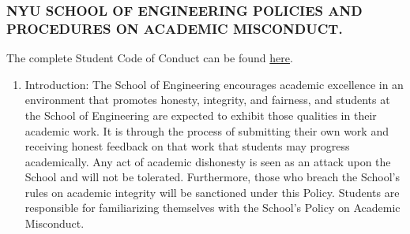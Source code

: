 \documentclass[10pt]{article}
\begin{document}
\subsubsection{NYU SCHOOL OF ENGINEERING POLICIES AND PROCEDURES ON ACADEMIC MISCONDUCT.}
The complete Student Code of Conduct can be found \href{https://engineering.nyu.edu/campus-and-community/student-life/office-student-affairs/policies/student-code-conduct}{here}.

\begin{enumerate}[label=\Alph*.]\itemsep0em 
	
	\item Introduction: The School of Engineering encourages academic excellence in an environment that promotes honesty, integrity, and fairness, and students at the School of Engineering are expected to exhibit those qualities in their academic work. It is through the process of submitting their own work and receiving honest feedback on that work that students may progress academically. Any act of academic dishonesty is seen as an attack upon the School and will not be tolerated. Furthermore, those who breach the School’s rules on academic integrity will be sanctioned under this Policy. Students are responsible for familiarizing themselves with the School’s Policy on Academic Misconduct.
	

\end{enumerate}
\end{document}

